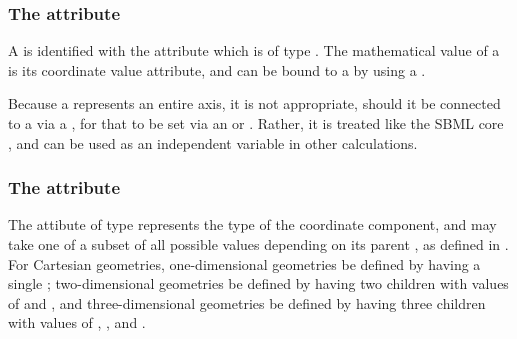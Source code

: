 \subsubsection{The \fixttspace{} attribute}
A \CoordinateComponent is identified with the  attribute which is of type .  The mathematical value of a \CoordinateComponent is its coordinate value  attribute, and can be bound to a \Parameter by using a \SpatialSymbolReference.
 
Because a \CoordinateComponent represents an entire axis, it is not appropriate, should it be connected to a \Parameter via a \SpatialSymbolReference, for that \Parameter to be set via an \InitialAssignment or \Rule.  Rather, it is treated like the SBML core  , and can be used as an independent variable in other calculations.

\subsubsection{The \fixttspace{} attribute}
The  attibute of type  represents the type of the coordinate component, and may take one of a subset of all possible  values depending on its parent \Geometry, as defined in .
For Cartesian geometries, one-dimensional geometries  be defined by having a single  \CoordinateComponent; two-dimensional geometries  be defined by having  two \CoordinateComponent children with  values of  and , and three-dimensional geometries  be defined by having  three \CoordinateComponent children with  values of , , and .  

